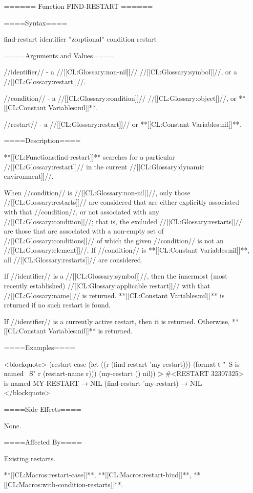 ====== Function FIND-RESTART ======

====Syntax====

\Defun find-restart {identifier ''&optional'' condition} {restart}

====Arguments and Values====

//identifier// - a //[[CL:Glossary:non-nil]]// //[[CL:Glossary:symbol]]//, or a //[[CL:Glossary:restart]]//.

//condition// - a //[[CL:Glossary:condition]]// //[[CL:Glossary:object]]//, or **[[CL:Constant Variables:nil]]**.

//restart// - a //[[CL:Glossary:restart]]// or **[[CL:Constant Variables:nil]]**.

====Description====

**[[CL:Functions:find-restart]]** searches for a particular //[[CL:Glossary:restart]]// in the current //[[CL:Glossary:dynamic environment]]//.

When //condition// is //[[CL:Glossary:non-nil]]//, only those //[[CL:Glossary:restarts]]// are considered that are either explicitly associated with that //condition//, or not associated with any //[[CL:Glossary:condition]]//; that is, the excluded //[[CL:Glossary:restarts]]// are those that are associated with a non-empty set of //[[CL:Glossary:conditions]]// of which the given //condition// is not an //[[CL:Glossary:element]]//. If //condition// is **[[CL:Constant Variables:nil]]**, all //[[CL:Glossary:restarts]]// are considered.

If //identifier// is a //[[CL:Glossary:symbol]]//, then the innermost (most recently established) //[[CL:Glossary:applicable restart]]// with that //[[CL:Glossary:name]]// is returned. **[[CL:Constant Variables:nil]]** is returned if no such restart is found.

If //identifier// is a currently active restart, then it is returned. Otherwise, **[[CL:Constant Variables:nil]]** is returned.

====Examples====

<blockquote> (restart-case (let ((r (find-restart 'my-restart))) (format t "~S is named ~S" r (restart-name r))) (my-restart () nil))
▷ #<RESTART 32307325> is named MY-RESTART → NIL (find-restart 'my-restart) → NIL </blockquote>

====Side Effects====

None.

====Affected By====

Existing restarts.

**[[CL:Macros:restart-case]]**, **[[CL:Macros:restart-bind]]**, **[[CL:Macros:with-condition-restarts]]**.

